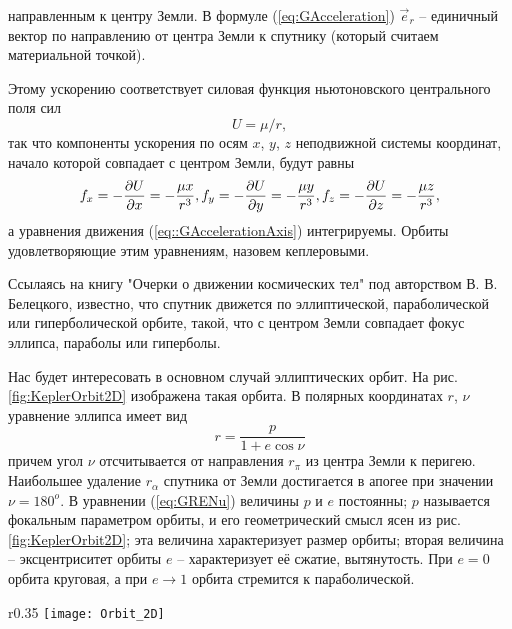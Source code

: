 направленным к центру Земли. В формуле (\ref{eq:GAcceleration}) $\vec{e}_r$ --
единичный вектор по направлению от центра Земли к спутнику (который считаем материальной точкой).\par
Этому ускорению соответствует силовая функция ньютоновского центрального поля сил
\begin{equation}
  U = \mu/r,
\end{equation}
так что компоненты ускорения по осям $x$, $y$, $z$ неподвижной системы координат,
начало которой совпадает с центром Земли, будут равны
\begin{equation} \label{eq::GAccelerationAxis}
  f_x = -\frac{\partial U}{\partial x} = - \frac{\mu x}{r^3}, \\
  f_y = -\frac{\partial U}{\partial y} = - \frac{\mu y}{r^3}, \\
  f_z = -\frac{\partial U}{\partial z} = - \frac{\mu z}{r^3},
\end{equation}
а уравнения движения (\ref{eq::GAccelerationAxis}) интегрируемы. Орбиты удовлетворяющие
этим уравнениям, назовем кеплеровыми.\par
Ссылаясь на книгу "Очерки о движении космических тел" под авторством В. В. Белецкого,
известно, что спутник движется по эллиптической, параболической или гиперболической орбите,
такой, что с центром Земли совпадает фокус эллипса, параболы или гиперболы.\par
Нас будет интересовать в основном случай эллиптических орбит. На рис. \ref{fig:KeplerOrbit2D}
изображена такая орбита. В полярных координатах $r$, $\nu$ уравнение эллипса имеет вид
\begin{equation} \label{eq:GRENu}
  r = \frac{p}{1 + e\cos\nu}
\end{equation}
причем угол $\nu$ отсчитывается от направления $r_{\pi}$ из центра Земли к перигею.
Наибольшее удаление $r_{\alpha}$ спутника от Земли достигается в апогее при значении
$\nu = 180^{o}$.
В уравнении (\ref{eq:GRENu}) величины $p$ и $e$ постоянны; $p$ называется
фокальным параметром орбиты, и его геометрический смысл ясен из рис. \ref{fig:KeplerOrbit2D};
эта величина характеризует размер орбиты; вторая величина -- эксцентриситет орбиты $e$ --
характеризует её сжатие, вытянутость.
При $e = 0$ орбита круговая, а при $e \rightarrow 1$
орбита стремится к параболической.
\begin{wrapfigure}{r}{0.35\textwidth}
  \centering
  \texttt{[image: Orbit\_2D]}
  \caption{Кеплеровская эллиптическая орбита}
  \label{fig:KeplerOrbit2D}
\end{wrapfigure}
